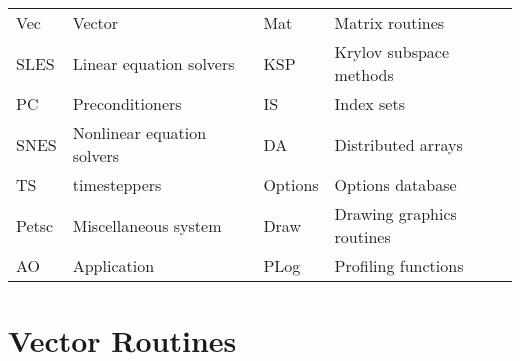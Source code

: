 %
%


\def\tightboxit#1{\vbox{\hsize=6.6in \hrule\hbox{\vrule\vbox{\hbox{#1}}\vrule
\hss}\hrule}}
\def\k#1#2#3{\tightboxit{
    \parindent=0pt\hskip.3in\begin{tabular}{l} #2 \\ #3 \end{tabular}}}
\def\CoDe#1{
    \parbox[t]{6.0in}{\raggedright \parindent=-0.4in {\bf #1}}\break}
\def\DeFn#1{
    \parbox[t]{6.0in}{\raggedright #1 \vskip2pt}\break}



\vspace{.2cm}

\begin{tabular}{llll}
 Vec&Vector&Mat&Matrix routines\\
SLES&Linear equation solvers& KSP&Krylov subspace methods\\
PC&Preconditioners&IS&Index sets\\
SNES & Nonlinear equation solvers&DA& Distributed arrays \\
TS   & timesteppers & Options & Options database \\
Petsc & Miscellaneous system & Draw & Drawing graphics routines\\
AO & Application & PLog & Profiling functions \\
\end{tabular}

\section{Vector Routines}

